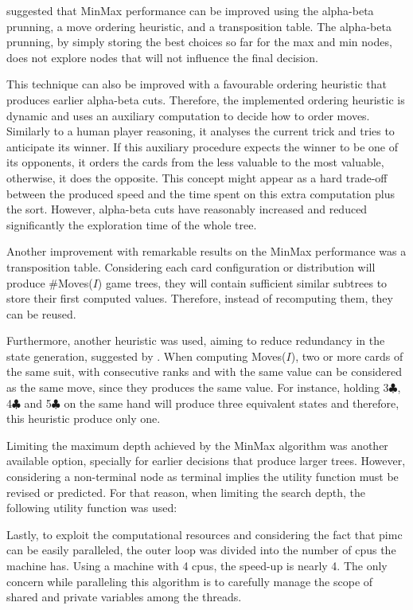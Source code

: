 \citet*{Russell2009} suggested that MinMax performance can be improved using the alpha-beta prunning, a move ordering heuristic, and a transposition table.
The alpha-beta prunning, by simply storing the best choices so far for the max and min nodes, does not explore nodes that will not influence the final decision.

This technique can also be improved with a favourable ordering heuristic that produces earlier alpha-beta cuts.
Therefore, the implemented ordering heuristic is dynamic and uses an auxiliary computation to decide how to order moves.
Similarly to a human player reasoning, it analyses the current trick and tries to anticipate its winner.
If this auxiliary procedure expects the winner to be one of its opponents, it orders the cards from the less valuable to the most valuable, otherwise, it does the opposite.
This concept might appear as a hard trade-off between the produced speed and the time spent on this extra computation plus the sort.
However, alpha-beta cuts have reasonably increased and reduced significantly the exploration time of the whole tree.

Another improvement with remarkable results on the MinMax performance was a transposition table.
Considering each card configuration or distribution will produce \#Moves($I$) game trees, they will contain sufficient similar subtrees to store their first computed values.
Therefore, instead of recomputing them, they can be reused.

Furthermore, another heuristic was used, aiming to reduce redundancy in the state generation, suggested by \citet{Buro}.
When computing Moves($I$), two or more cards of the same suit, with consecutive ranks and with the same value can be considered as the same move, since they produces the same value.
For instance, holding 3$\clubsuit$, 4$\clubsuit$ and 5$\clubsuit$ on the same hand will produce three equivalent states and therefore, this heuristic produce only one.

Limiting the maximum depth achieved by the MinMax algorithm was another available option, specially for earlier decisions that produce larger trees.
However, considering a non-terminal node as terminal implies the utility function must be revised or predicted.
For that reason, when limiting the search depth, the following utility function was used:

Lastly, to exploit the computational resources and considering the fact that \ac{pimc} can be easily paralleled, the outer loop was divided into the number of \acp{cpu} the machine has.
Using a machine with 4 \acp{cpu}, the speed-up is nearly 4.
The only concern while paralleling this algorithm is to carefully manage the scope of shared and private variables among the threads.











